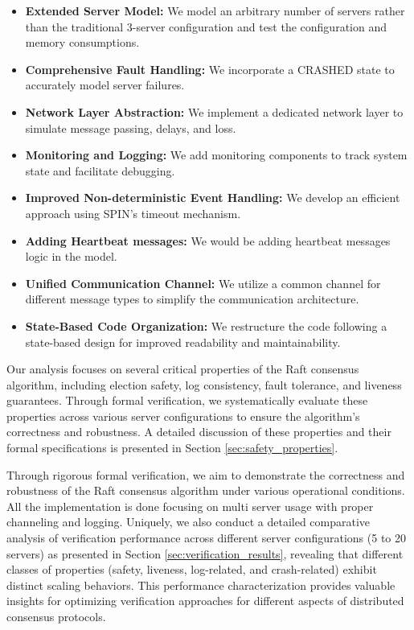 \documentclass[a4paper]{llncs}
\begin{document}
    \begin{itemize}
        \item \textbf{Extended Server Model:} We model an arbitrary number of
            servers rather than the traditional 3-server configuration and test the configuration and memory consumptions.

        \item \textbf{Comprehensive Fault Handling:} We incorporate a CRASHED
            state to accurately model server failures.

        \item \textbf{Network Layer Abstraction:} We implement a dedicated
            network layer to simulate message passing, delays, and loss.

        \item \textbf{Monitoring and Logging:} We add monitoring components to
            track system state and facilitate debugging.

        \item \textbf{Improved Non-deterministic Event Handling:} We develop an
            efficient approach using SPIN's timeout mechanism.

        \item \textbf{Adding Heartbeat messages:} We would be adding heartbeat
            messages logic in the model.

        \item \textbf{Unified Communication Channel:} We utilize a common
            channel for different message types to simplify the communication
            architecture.

        \item \textbf{State-Based Code Organization:} We restructure the code
            following a state-based design for improved readability and
            maintainability.
    \end{itemize}
    Our analysis focuses on several critical properties of the Raft consensus algorithm, including election safety, log consistency, fault tolerance, and liveness guarantees. Through formal verification, we systematically evaluate these properties across various server configurations to ensure the algorithm's correctness and robustness. A detailed discussion of these properties and their formal specifications is presented in Section \ref{sec:safety_properties}.

    Through rigorous formal verification, we aim to demonstrate the correctness and robustness of the Raft consensus algorithm
    under various operational conditions. All the implementation is done focusing
    on multi server usage with proper channeling and logging. Uniquely, we also conduct a detailed comparative analysis of verification performance across different server configurations (5 to 20 servers) as presented in Section \ref{sec:verification_results}, revealing that different classes of properties (safety, liveness, log-related, and crash-related) exhibit distinct scaling behaviors. This performance characterization provides valuable insights for optimizing verification approaches for different aspects of distributed consensus protocols.
\end{document}
